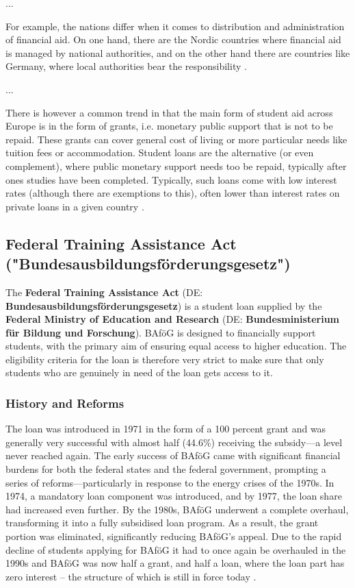 ...

For example, the nations differ when it comes to distribution and administration of financial aid. On one hand, there are the Nordic countries where financial aid is managed by national authorities, and on the other hand there are countries like Germany, where local authorities bear the responsibility \citep{schwarz_study_2004}.

...

There is however a common trend in that the main form of student aid across Europe is in the form of grants, i.e. monetary public support that is not to be repaid. These grants can cover general cost of living or more particular needs like tuition fees or accommodation. Student loans are the alternative (or even complement), where public monetary support needs too be repaid, typically after ones studies have been completed. Typically, such loans come with low interest rates (although there are exemptions to this), often lower than interest rates on private loans in a given country \citep{schwarz_study_2004}.


\subsection{Federal Training Assistance Act ("Bundesausbildungsförderungsgesetz") } \label{subsection:federal-training-assistance-act} 
The \textbf{Federal Training Assistance Act} (DE: \textbf{Bundesausbildungsförderungsgesetz}) is a student loan supplied by the \textbf{Federal Ministry of Education and Research} (DE: \textbf{Bundesministerium für Bildung und Forschung}). 
BAföG is designed to financially support students, with the primary aim of ensuring equal access to higher education. The eligibility criteria for the loan is therefore very strict to make sure that only students who are genuinely in need of the loan gets access to it.

\subsubsection{History and Reforms} 
\label{subsection:reforms}
The loan was introduced in 1971 in the form of a 100 percent grant and was generally very successful with almost half (44.6\%) receiving the subsidy---a level never reached again. 
The early success of BAföG came with significant financial burdens for both the federal states and the federal government, prompting a series of reforms—particularly in response to the energy crises of the 1970s. In 1974, a mandatory loan component was introduced, and by 1977, the loan share had increased even further. By the 1980s, BAföG underwent a complete overhaul, transforming it into a fully subsidised loan program. As a result, the grant portion was eliminated, significantly reducing BAföG's appeal.
Due to the rapid decline of students applying for BAföG it had to once again be overhauled in the 1990s and BAföG was now half a grant, and half a loan, where the loan part has zero interest -- the structure of which is still in force today \citep{lost_geschichte_2025}.

